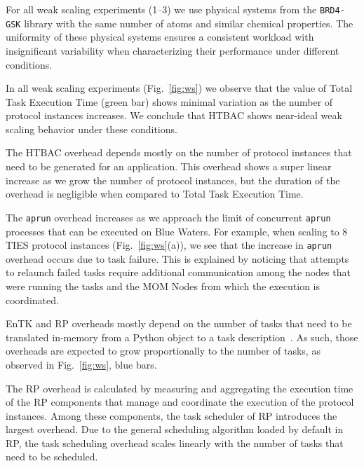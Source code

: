 For all weak scaling experiments (1--3) we use physical systems from the
\texttt{BRD4-GSK} library with the same number of atoms and similar chemical
properties. The uniformity of these physical systems ensures a consistent
workload with insignificant variability when characterizing their performance
under different conditions.%
%

In all weak scaling experiments (Fig.~\ref{fig:ws}) we observe that the value
of Total Task Execution Time (green bar) shows minimal variation as the
number of protocol instances increases. We conclude that HTBAC shows
near-ideal weak scaling behavior under these conditions.

The HTBAC overhead depends mostly on the number of protocol instances that
need to be generated for an application. This overhead shows a super linear
increase as we grow the number of protocol instances, but the duration of the
overhead is negligible when compared to Total Task Execution Time.

The \texttt{aprun} overhead increases as we approach the limit of concurrent
\texttt{aprun} processes that can be executed on Blue Waters. For example,
when scaling to 8 TIES protocol instances (Fig.~\ref{fig:ws}(a)), we see
that the increase in \texttt{aprun} overhead occurs due to task failure. This
is explained by noticing that attempts to relaunch failed tasks require
additional communication among the nodes that were running the tasks and the
MOM Nodes from which the execution is coordinated.

EnTK and RP overheads mostly depend on the number of tasks that need to be
translated in-memory from a Python object to a task
description~\cite{dakka2017,merzky2018}. As such, those overheads are
expected to grow proportionally to the number of tasks, as observed in
Fig.~\ref{fig:ws}, blue bars.

The RP overhead is calculated by measuring and aggregating the execution time
of the RP components that manage and coordinate the execution of the protocol
instances. Among these components, the task scheduler of RP introduces the
largest overhead. Due to the general scheduling algorithm loaded by default
in RP, the task scheduling overhead scales linearly with the number of tasks
that need to be scheduled.

